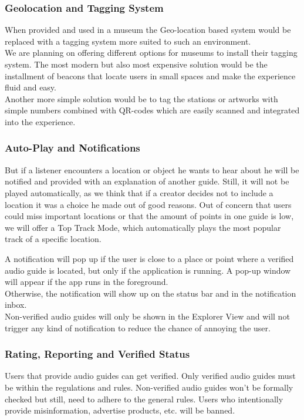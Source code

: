 \documentclass[12pt]{article}
\theoremstyle{definition}
\newenvironment{text}{
}{}
\begin{document}
\begin{text}
\subsubsection{Geolocation and Tagging System}
When provided and used in a museum the Geo-location based system would be replaced with a tagging system more suited to such an environment.\\
We are planning on offering different options for museums to install their tagging system. The most modern but also most expensive solution would be the installment of beacons that locate users in small spaces and make the experience fluid and easy.\\
Another more simple solution would be to tag the stations or artworks with simple numbers combined with QR-codes which are easily scanned and integrated into the experience.\newline

\subsubsection{Auto-Play and Notifications}
But if a listener encounters a location or object he wants to hear about he will be notified and provided with an explanation of another guide. Still, it will not be played automatically, as we think that if a creator decides not to include a location it was a choice he made out of good reasons.
Out of concern that users could miss important locations or that the amount of points in one guide is low, we will offer a Top Track Mode, which automatically plays the most popular track of a specific location.\newline

A notification will pop up if the user is close to a place or point where a verified audio guide is located, but only if the application is running. A pop-up window will appear if the app runs in the foreground.\\ Otherwise, the notification will show up on the status bar and in the notification inbox. \\
Non-verified audio guides will only be shown in the Explorer View and will not trigger any kind of notification to reduce the chance of annoying the user.\newline

\subsubsection{Rating, Reporting and Verified Status} 
Users that provide audio guides can get verified. Only verified audio guides must be within the regulations and rules. Non-verified audio guides won’t be formally checked but still, need to adhere to the general rules. Users who intentionally provide misinformation, advertise products, etc. will be banned.


\end{text}
\end{document}
